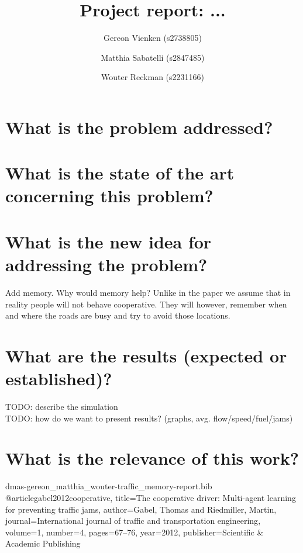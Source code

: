 \documentclass[hidelinks]{article}
\title{Project report: ...}
\author{
    Gereon Vienken (s2738805) \\
    \and Matthia Sabatelli (s2847485) \\
    \and Wouter Reckman (s2231166)
}
\date{}
\begin{document}
\maketitle
\thispagestyle{empty}

\section{What is the problem addressed?}

\section{What is the state of the art concerning this problem?}

\section{What is the new idea for addressing the problem?}
Add memory. Why would memory help? Unlike in the paper we assume that in reality people will not behave cooperative. They will however, remember when and where the roads are busy and try to avoid those locations.

\section{What are the results (expected or established)?}
TODO: describe the simulation \\
TODO: how do we want to present results? (graphs, avg. flow/speed/fuel/jams)

\section{What is the relevance of this work?}

\printbibliography

\begin{filecontents}{dmas-gereon_matthia_wouter-traffic_memory-report.bib}
@article{gabel2012cooperative,
  title={The cooperative driver: Multi-agent learning for preventing traffic jams},
  author={Gabel, Thomas and Riedmiller, Martin},
  journal={International journal of traffic and transportation engineering},
  volume={1},
  number={4},
  pages={67--76},
  year={2012},
  publisher={Scientific \& Academic Publishing}
}
\end{filecontents}
\end{document}
